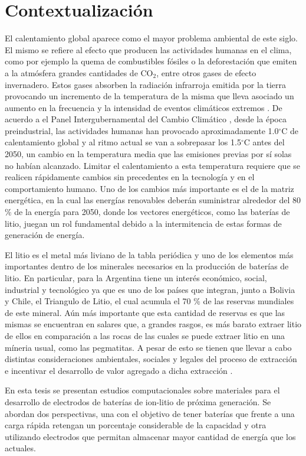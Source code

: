 \section{Contextualización}

El calentamiento global aparece como el mayor problema ambiental de este siglo.
El mismo se refiere al efecto que producen las actividades humanas en el clima, 
como por ejemplo la quema de combustibles fósiles o la deforestación que emiten 
a la atmósfera grandes cantidades de CO$_2$, entre otros gases de efecto 
invernadero. Estos gases absorben la radiación infrarroja emitida por la tierra 
provocando un incremento de la temperatura de la misma que lleva asociado un 
aumento en la frecuencia y la intensidad de eventos climáticos extremos 
\cite{houghton2005}. De acuerdo a el Panel Intergubernamental del Cambio Climático 
\cite{IPCC}, desde la época preindustrial, las actividades humanas han provocado 
aproximadamente 1.0$^{\circ}$C de calentamiento global y al ritmo actual se van 
a sobrepasar los 1.5$^{\circ}$C antes del 2050, un cambio en la temperatura
media que las emisiones previas por sí solas no habían alcanzado. Limitar el 
calentamiento a esta temperatura requiere que se realicen rápidamente cambios 
sin precedentes en la tecnología y en el comportamiento humano. Uno de los 
cambios más importante es el de la matriz energética, en la cual las energías 
renovables deberán suministrar alrededor del 80 \% de la energía para 2050, donde 
los vectores energéticos, como las baterías de litio, juegan un rol fundamental 
debido a la intermitencia de estas formas de generación de energía.

El litio es el metal más liviano de la tabla periódica y uno de los elementos más
importantes dentro de los minerales necesarios en la producción de baterías de
litio. En particular, para la Argentina tiene un interés económico, social, 
industrial y tecnológico ya que es uno de los países que integran, junto a 
Bolivia y Chile, el Triangulo de Litio, el cual acumula el 70 \% de las reservas 
mundiales de este mineral. Aún más importante que esta cantidad de reservas es 
que las mismas se encuentran en salares que, a grandes rasgos, es más barato
extraer litio de ellos en comparación a las rocas de las cuales se puede extraer 
litio en una míneria usual, como las pegmatitas. A pesar de esto se tienen que
llevar a cabo distintas consideraciones ambientales, sociales y legales del 
proceso de extracción e incentivar el desarrollo de valor agregado a dicha 
extracción \cite{gutierrez2022, petavratzi2022, obaya2021, romero2021, 
heredia2020, fornillo2019}.

En esta tesis se presentan estudios computacionales sobre materiales para el 
desarrollo de electrodos de baterías de ion-litio de próxima generación. Se 
abordan dos perspectivas, una con el objetivo de tener baterías que frente a una 
carga rápida retengan un porcentaje considerable de la capacidad y otra 
utilizando electrodos que permitan almacenar mayor cantidad de energía que los 
actuales.
